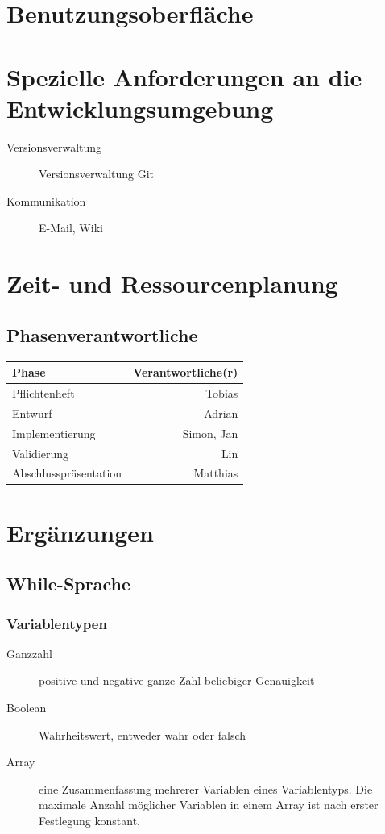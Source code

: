 \documentclass[a4paper,10pt]{article}
\begin{document}
\section{Benutzungsoberfläche}

\section{Spezielle Anforderungen an die Entwicklungsumgebung}
\begin{description}
  \item[Versionsverwaltung] Versionsverwaltung Git
  \item[Kommunikation] E-Mail, Wiki
\end{description}

\section{Zeit- und Ressourcenplanung}
\subsection{Phasenverantwortliche}
\begin{tabular}[h]{| l | r |}
\hline
\textbf{Phase} & \textbf{Verantwortliche(r)}\\
\hline
Pflichtenheft & Tobias\\
\hline
Entwurf & Adrian\\
\hline
Implementierung & Simon, Jan\\
\hline
Validierung & Lin\\
\hline
Abschlusspräsentation & Matthias\\
\hline
\end{tabular}


\section{Ergänzungen}
\subsection{While-Sprache}
\subsubsection{Variablentypen}
\begin{description}
\item[Ganzzahl] positive und negative ganze Zahl beliebiger Genauigkeit
\item[Boolean] Wahrheitswert, entweder wahr oder falsch
\item[Array] eine Zusammenfassung mehrerer Variablen eines Variablentyps. Die maximale Anzahl möglicher Variablen in einem Array ist nach erster Festlegung konstant.
\end{description}
\end{document}
